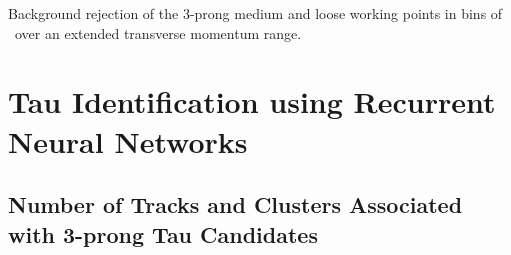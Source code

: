 \begin{minipage}{\textwidth}
\begin{subfigure}{0.48\textwidth}
  \end{subfigure}
  \caption[Background rejection of the 3-prong medium and loose working points
  in bins of \tauhadvis~\pt for the BDT-based identification (extended
  \tauhadvis~\pt range)]{Background rejection of the 3-prong medium and loose
    working points in bins of \tauhadvis~\pt over an extended transverse
    momentum range.}
\end{minipage}


\clearpage
\section{Tau Identification using Recurrent Neural Networks}
\label{app:rnn}

\subsection{Number of Tracks and Clusters Associated with 3-prong Tau
  Candidates}

